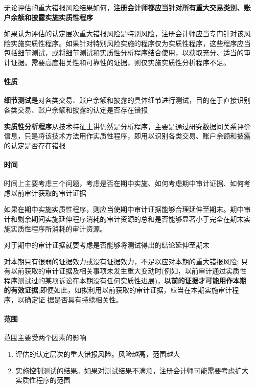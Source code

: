 \documentclass[UTF8,12pt]{ctexart}
\numberwithin{equation}{section} %
\numberwithin{figure}{section}
\numberwithin{table}{section}
\begin{document}
	无论评估的重大错报风险结果如何，\textbf{注册会计师都应当针对所有重大交易类别、账户余额和披露实施实质性程序}
	
	如果认为评估的认定层次重大错报风险是特别风险，注册会计师应当专门针对该风险实施实质性程序。如果针对特别风险实施的程序仅为实质性程序，这些程序应当包括细节测试，或将细节测试和实质性分析程序结合使用，以获取充分、适当的审计证据。需要高度相关性和可靠性的证据，则仅实施实质性分析程序不足。
	
	\paragraph{性质}
	\textbf{细节测试}是对各类交易、账户余额和披露的具体细节进行测试，目的在于直接识别各类交易、账户余额和披露的认定是否存在错报
	
	\textbf{实质性分析程序}从技术特征上讲仍然是分析程序，主要是通过研究数据间关系评价信息，只是将该技术方法用作实质性程序，即用以识别各类交易、账户余额和披露的认定是否存在错报
	
	\paragraph{时间}
	时间上主要考虑三个问题，考虑是否在期中实施、如何考虑期中审计证据、如何考虑以前审计获取的审计证据
	
	如果在期中实施实质性程序，则应当使期中审计证据能够合理延伸至期末。期中审计和剩余期间实施延伸程序消耗的审计资源的总和是否能够显著小于完全在期末实施实质性程序所消耗的审计资源。
	
	对于期中的审计证据就要考虑是否能够将测试得出的结论延伸至期末
	
	对本期只有很弱的证据效力或没有证据效力，不足以应对本期的重大错报风险; 只有以前获取的审计证据及相关事项未发生重大变动时(例如，以前审计通过实质性程序测试过的某项诉讼在本期没有任何实质性进展)，\textbf{以前的证据才可能用作本期的有效证据};即便如此，如拟利用以前获取的审计证据，应当在本期实施审计程序，以确定证 据是否具有持续相关性。
	
	\paragraph{范围}
	范围主要受两个因素的影响
	\begin{enumerate}
		\item 评估的认定层次的重大错报风险。风险越高，范围越大
		
		\item 实施控制测试的结果。如果对测试结果不满意，注册会计师可能需要考虑扩大实质性程序的范围
	\end{enumerate}
	
\end{document}

